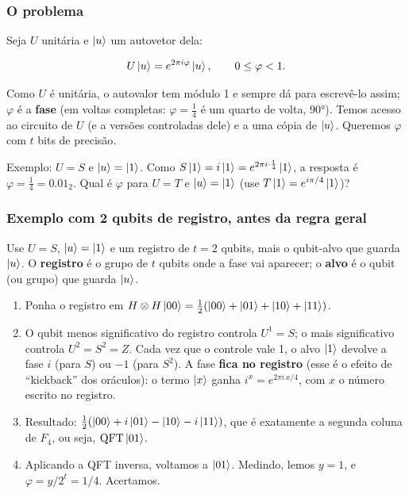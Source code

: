 \subsubsection{O problema}\label{o-problema}

Seja \(U\) unitária e \(\left|{u}\right>\) um autovetor dela:

\[
U\left|{u}\right> = e^{2\pi i\varphi}\left|{u}\right>, \qquad 0\le\varphi<1.
\]

Como \(U\) é unitária, o autovalor tem módulo 1 e sempre dá para escrevê-lo assim; \(\varphi\) é a \textbf{fase} (em voltas completas: \(\varphi=\tfrac14\) é um quarto de volta, 90°). Temos acesso ao circuito de \(U\) (e a versões controladas dele) e a uma cópia de \(\left|{u}\right>\). Queremos \(\varphi\) com \(t\) bits de precisão.

Exemplo: \(U=S\) e \(\left|{u}\right>=\left|{1}\right>\). Como \(S\left|{1}\right>=i\left|{1}\right> = e^{2\pi i\cdot\frac14}\left|{1}\right>\), a resposta é \(\varphi=\tfrac14=0.01_2\). Qual é \(\varphi\) para \(U=T\) e \(\left|{u}\right>=\left|{1}\right>\) (use \(T\left|{1}\right>=e^{i\pi/4}\left|{1}\right>\))?

\subsubsection{Exemplo com 2 qubits de registro, antes da regra geral}\label{exemplo-com-2-qubits-de-registro-antes-da-regra-geral}

Use \(U=S\), \(\left|{u}\right>=\left|{1}\right>\) e um registro de \(t=2\) qubits, mais o qubit-alvo que guarda \(\left|{u}\right>\). O \textbf{registro} é o grupo de \(t\) qubits onde a fase vai aparecer; o \textbf{alvo} é o qubit (ou grupo) que guarda \(\left|{u}\right>\).

\begin{enumerate}
\def\labelenumi{\arabic{enumi}.}
\tightlist
\item
  Ponha o registro em \(H\otimes H\left|{00}\right>=\tfrac12(\left|{00}\right>+\left|{01}\right>+\left|{10}\right>+\left|{11}\right>)\).
\item
  O qubit menos significativo do registro controla \(U^1=S\); o mais significativo controla \(U^2=S^2=Z\). Cada vez que o controle vale 1, o alvo \(\left|{1}\right>\) devolve a fase \(i\) (para \(S\)) ou \(-1\) (para \(S^2\)). A fase \textbf{fica no registro} (esse é o efeito de ``kickback'' dos oráculos): o termo \(\left|{x}\right>\) ganha \(i^{x}=e^{2\pi i\,x/4}\), com \(x\) o número escrito no registro.
\item
  Resultado: \(\tfrac12(\left|{00}\right>+i\left|{01}\right>-\left|{10}\right>-i\left|{11}\right>)\), que é exatamente a segunda coluna de \(F_4\), ou seja, \(\mathrm{QFT}\left|{01}\right>\).
\item
  Aplicando a QFT inversa, voltamos a \(\left|{01}\right>\). Medindo, lemos \(y=1\), e \(\varphi = y/2^t = 1/4\). Acertamos.
\end{enumerate}

